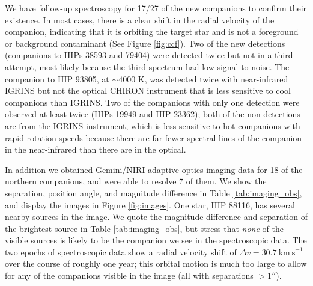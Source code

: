 \documentclass{emulateapj}
\begin{document}
We have follow-up spectroscopy for 17/27 of the new companions to confirm their existence. In most cases, there is a clear shift in the radial velocity of the companion, indicating that it is orbiting the target star and is not a foreground or background contaminant (See Figure \ref{fig:ccf}). Two of the new detections (companions to HIPs 38593 and 79404) were detected twice but not in a third attempt, most likely because the third spectrum had low signal-to-noise. The companion to HIP 93805, at $\sim 4000$ K, was detected twice with near-infrared IGRINS but not the optical CHIRON instrument that is less sensitive to cool companions than IGRINS. Two of the companions with only one detection were observed at least twice (HIPs 19949 and HIP 23362); both of the non-detections are from the IGRINS instrument, which is less sensitive to hot companions with rapid rotation speeds because there are far fewer spectral lines of the companion in the near-infrared than there are in the optical.


In addition we obtained Gemini/NIRI adaptive optics imaging data for 18 of the northern companions, and were able to resolve 7 of them. We show the separation, position angle, and magnitude difference in Table \ref{tab:imaging_obs}, and display the images in Figure \ref{fig:images}. One star, HIP 88116, has several nearby sources in the image. We quote the magnitude difference and separation of the brightest source in Table \ref{tab:imaging_obs}, but stress that \emph{none} of the visible sources is likely to be the companion we see in the spectroscopic data. The two epochs of spectroscopic data show a radial velocity shift of $\Delta v = 30.7\ \mathrm{km\ s}^{-1}$ over the course of roughly one year; this orbital motion is much too large to allow for any of the companions visible in the image (all with separations $ > 1''$).
\end{document}
